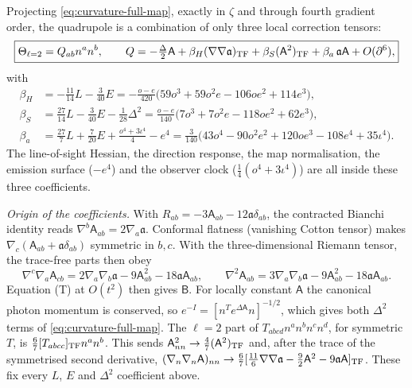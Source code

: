 \documentclass[11pt]{article}
\theoremstyle{definition}
\theoremstyle{remark}
\begin{document}
Projecting \eqref{eq:curvature-full-map}, exactly in $\zeta$ and through fourth gradient
order, the quadrupole is a combination of only three local correction tensors:
\begin{equation}\label{eq:three-tensor}
\boxed{\Theta_{\ell=2}=Q_{ab}n^an^b,\qquad
Q=-\tfrac\Delta2\mathsf A+\beta_H(\nabla\nabla\mathfrak a)_{\rm TF}+\beta_S(\mathsf A^2)_{\rm TF}
+\beta_a\,\mathfrak a\mathsf A+O(\partial^6),}
\end{equation}
with
\begin{align*}
\beta_H&=-\tfrac{11}{14}L-\tfrac3{40}E=-\tfrac{o-e}{420}\big(59o^3+59o^2e-106oe^2+114e^3\big),\\
\beta_S&=\tfrac{27}{14}L-\tfrac3{40}E-\tfrac1{28}\Delta^2=\tfrac{o-e}{140}\big(7o^3+7o^2e-118oe^2+62e^3\big),\\
\beta_a&=\tfrac{27}{7}L+\tfrac7{20}E+\tfrac{o^4+3\iota^4}4-e^4
=\tfrac3{140}\big(43o^4-90o^2e^2+120oe^3-108e^4+35\iota^4\big).
\end{align*}
The line-of-sight Hessian, the direction response, the map normalisation, the emission
surface ($-e^4$) and the observer clock ($\frac14(o^4+3\iota^4)$) are all inside these three
coefficients.

\emph{Origin of the coefficients.} With $R_{ab}=-3\mathsf A_{ab}-12\mathfrak a\delta_{ab}$, the contracted
Bianchi identity reads $\nabla^b\mathsf A_{ab}=2\nabla_a\mathfrak a$. Conformal flatness (vanishing
Cotton tensor) makes $\nabla_c(\mathsf A_{ab}+\mathfrak a\delta_{ab})$ symmetric in $b,c$. With the
three-dimensional Riemann tensor, the trace-free parts then obey
\[
\nabla^c\nabla_a\mathsf A_{cb}=2\nabla_a\nabla_b\mathfrak a-9\mathsf A^2_{ab}-18\mathfrak a\mathsf A_{ab},\qquad
\nabla^2\mathsf A_{ab}=3\nabla_a\nabla_b\mathfrak a-9\mathsf A^2_{ab}-18\mathfrak a\mathsf A_{ab}.
\]
Equation (T) at $O(t^2)$ then gives $\mathsf B$. For locally constant $\mathsf A$ the canonical
photon momentum is conserved, so $e^{-I}=[n^Te^{\Delta\mathsf A}n]^{-1/2}$, which gives both
$\Delta^2$ terms of \eqref{eq:curvature-full-map}. The $\ell=2$ part of $T_{abcd}n^an^bn^cn^d$, for
symmetric $T$, is $\frac67[T_{abcc}]_{\rm TF}n^an^b$. This sends
$\mathsf A_{nn}^2\to\frac47(\mathsf A^2)_{\rm TF}$ and, after the trace of the symmetrised second
derivative, $(\nabla_n\nabla_n\mathsf A)_{nn}\to\frac67[\frac{11}6\nabla\nabla\mathfrak a
-\frac92\mathsf A^2-9\mathfrak a\mathsf A]_{\rm TF}$. These fix every $L$, $E$ and $\Delta^2$ coefficient above.
\end{document}
